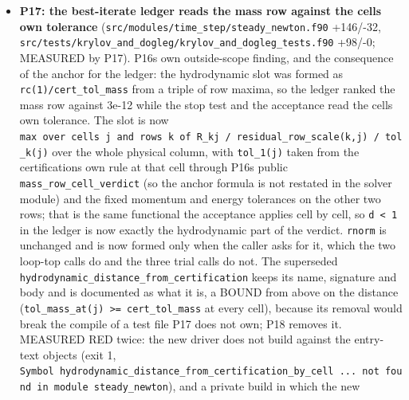 \documentclass[english,a4paper]{my_memo}
\begin{document}
\begin{itemize}
  pass by pass in both arms (7.38E-02 at cell 290, 7.22E-02 at 289, 7.06E-02 at
  288), and the three passes cost 15.47 s against the control\textquotesingle s 69.39 s. The
  derivation, both candidate estimates, the measured ratios and all three
  impact measurements are the appended section \textbf{"Anchor (6), 2026-09-11: the
  mass row\textquotesingle s rounding floor"} of
  \texttt{docs/certification\_tolerance\_anchoring\_20260910.md}; its nine earlier
  sections are byte-identical.
\item
  \textbf{P17: the best-iterate ledger reads the mass row against the cell\textquotesingle s own
  tolerance} (\texttt{src/modules/time\_step/steady\_newton.f90} +146/-32,
  \texttt{src/tests/krylov\_and\_dogleg/krylov\_and\_dogleg\_tests.f90} +98/-0; MEASURED by
  P17). P16\textquotesingle s own outside-scope finding, and the consequence of the anchor for
  the ledger: the hydrodynamic slot was formed as \texttt{rc(1)/cert\_tol\_mass} from a
  triple of row maxima, so the ledger ranked the mass row against 3e-12 while
  the stop test and the acceptance read the cell\textquotesingle s own tolerance. The slot is
  now \texttt{max\ over\ cells\ j\ and\ rows\ k\ of\ \textbar{}R\_kj\textbar{}\ /\ residual\_row\_scale(k,j)\ /\ tol\_k(j)} over the whole physical column, with \texttt{tol\_1(j)} taken from the
  certification\textquotesingle s own rule at that cell through P16\textquotesingle s public
  \texttt{mass\_row\_cell\_verdict} (so the anchor formula is not restated in the solver
  module) and the fixed momentum and energy tolerances on the other two rows;
  that is the same functional the acceptance applies cell by cell, so \texttt{d\ \textless{}\ 1}
  in the ledger is now exactly the hydrodynamic part of the verdict. \texttt{rnorm} is
  unchanged and is now formed only when the caller asks for it, which the two
  loop-top calls do and the three trial calls do not. The superseded
  \texttt{hydrodynamic\_distance\_from\_certification} keeps its name, signature and body
  and is documented as what it is, a BOUND from above on the distance
  (\texttt{tol\_mass\_at(j)\ \textgreater{}=\ cert\_tol\_mass} at every cell), because its removal would
  break the compile of a test file P17 does not own; P18 removes it. MEASURED
  RED twice: the new driver does not build against the entry-text objects
  (exit 1, \texttt{Symbol\ \textquotesingle{}hydrodynamic\_distance\_from\_certification\_by\_cell\textquotesingle{}\ ...\ not\ found\ in\ module\ \textquotesingle{}steady\_newton\textquotesingle{}}), and a private build in which the new

\end{itemize}
\end{document}
